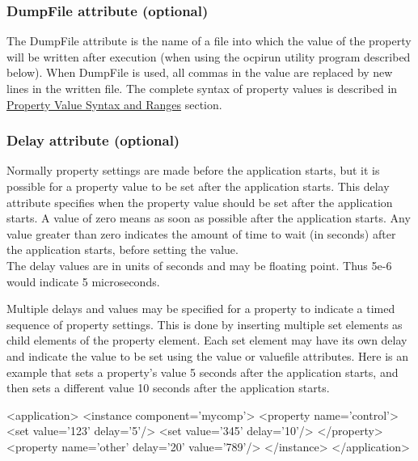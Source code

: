 \documentclass[10pt, a4paper, oneside]{article}
\renewcommand\_{\textunderscore\allowbreak} %
\begin{document}
\subsubsection{DumpFile attribute (optional)} The DumpFile attribute is the name of a file into which the value of the property will be written after execution (when using the ocpirun utility program described below). When DumpFile is used, all commas in the value are replaced by new lines in the written file. The complete syntax of property values is described in \hyperlink{sec:Property Value Syntax and Ranges}{Property Value Syntax and Ranges} section.
\subsubsection{Delay attribute (optional)}  Normally property settings are made before the application starts, but it is possible for a property value to be set after the application starts.  This delay attribute specifies when the property value should be set after the application starts.  A value of zero means as soon as possible after the application starts.  Any value greater than zero indicates the amount of time to wait (in seconds) after the application starts, before setting the value.\\

The delay values are in units of seconds and may be floating point.  Thus 5e-6 would indicate 5 microseconds.

Multiple delays and values may be specified for a property to indicate a timed sequence of property settings.  This is done by inserting multiple set elements as child elements of the property element.  Each set element may have its own delay and indicate the value to be set using the value or valuefile attributes. Here is an example that sets a property's value 5 seconds after the application starts, and then sets a different value 10 seconds after the application starts.\begin{ocpixml}
 <application>
      <instance component='mycomp'>
      		<property name='control'>
      			<set value='123' delay='5'/>
      			<set value='345' delay='10'/>
      		</property>
      		<property name='other' delay='20' value='789'/>
      </instance>
</application>\end{ocpixml}
\end{document}
